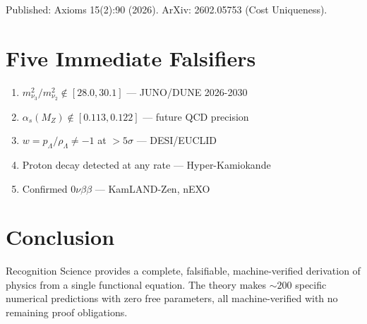 \documentclass[12pt,twocolumn]{article}
\begin{document}
Published: Axioms 15(2):90 (2026). ArXiv: 2602.05753 (Cost Uniqueness).

\section{Five Immediate Falsifiers}

\begin{enumerate}
\item $m_{\nu_3}^2/m_{\nu_2}^2 \notin [28.0, 30.1]$ — JUNO/DUNE 2026-2030
\item $\alpha_s(M_Z) \notin [0.113, 0.122]$ — future QCD precision
\item $w = p_\Lambda/\rho_\Lambda \neq -1$ at $> 5\sigma$ — DESI/EUCLID
\item Proton decay detected at any rate — Hyper-Kamiokande
\item Confirmed $0\nu\beta\beta$ — KamLAND-Zen, nEXO
\end{enumerate}

\section{Conclusion}

Recognition Science provides a complete, falsifiable, machine-verified derivation of 
physics from a single functional equation. The theory makes $\sim 200$ specific 
numerical predictions with zero free parameters, all machine-verified with no remaining proof obligations.
\end{document}
